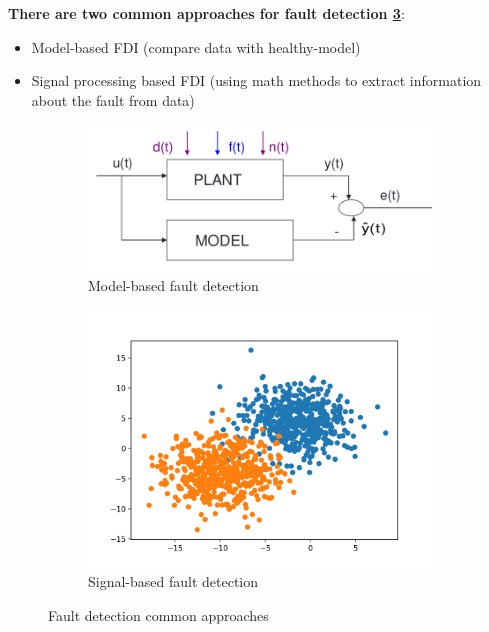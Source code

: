 \documentclass[class=article, crop=false]{standalone}
\begin{document}
\textbf{There are two common approaches for fault detection
\ref{fig:fault_detection}}:
\begin{itemize}
\item{Model-based FDI (compare data with healthy-model)}
\item{Signal processing based FDI (using math methods to extract information
    about the fault from data)}
\end{itemize}

\begin{figure}[h]
    \centering

\begin{subfigure}{0.5\textwidth}
    \includegraphics[width=0.9\linewidth]{model_based.png}
    \caption{Model-based fault detection}
    \label{fig:model_based}
\end{subfigure}%
\begin{subfigure}{0.5\textwidth}
    \includegraphics[width=0.9\linewidth]{signal_based.png}
    \caption{Signal-based fault detection}
    \label{fig:signal_based}
\end{subfigure}

\caption{Fault detection common approaches}
\label{fig:fault_detection}

\end{figure}
\end{document}
